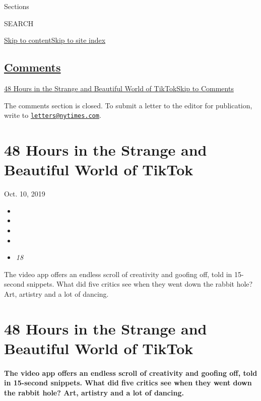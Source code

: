 Sections

SEARCH

\protect\hyperlink{site-content}{Skip to
content}\protect\hyperlink{site-index}{Skip to site index}

\hypertarget{comments}{%
\subsection{\texorpdfstring{\protect\hyperlink{commentsContainer}{Comments}}{Comments}}\label{comments}}

\href{}{48 Hours in the Strange and Beautiful World of
TikTok}\href{}{Skip to Comments}

The comments section is closed. To submit a letter to the editor for
publication, write to
\href{mailto:letters@nytimes.com}{\nolinkurl{letters@nytimes.com}}.

\hypertarget{48-hours-in-the-strange-and-beautiful-world-of-tiktok}{%
\section{48 Hours in the Strange and Beautiful World of
TikTok}\label{48-hours-in-the-strange-and-beautiful-world-of-tiktok}}

Oct. 10, 2019

\begin{itemize}
\item
\item
\item
\item
\item
  \emph{18}
\end{itemize}

The video app offers an endless scroll of creativity and goofing off,
told in 15-second snippets. What did five critics see when they went
down the rabbit hole? Art, artistry and a lot of dancing.

\hypertarget{48-hours-in-the-strange-and-beautiful-world-of-tiktok-1}{%
\section{48 Hours in the Strange and Beautiful World of
TikTok}\label{48-hours-in-the-strange-and-beautiful-world-of-tiktok-1}}

\hypertarget{the-video-app-offers-an-endless-scroll-of-creativity-and-goofing-off-told-in-15-second-snippets-what-did-five-critics-see-when-they-went-down-the-rabbit-hole-art-artistry-and-a-lot-of-dancing}{%
\paragraph{The video app offers an endless scroll of creativity and
goofing off, told in 15-second snippets. What did five critics see when
they went down the rabbit hole? Art, artistry and a lot of
dancing.}\label{the-video-app-offers-an-endless-scroll-of-creativity-and-goofing-off-told-in-15-second-snippets-what-did-five-critics-see-when-they-went-down-the-rabbit-hole-art-artistry-and-a-lot-of-dancing}}

